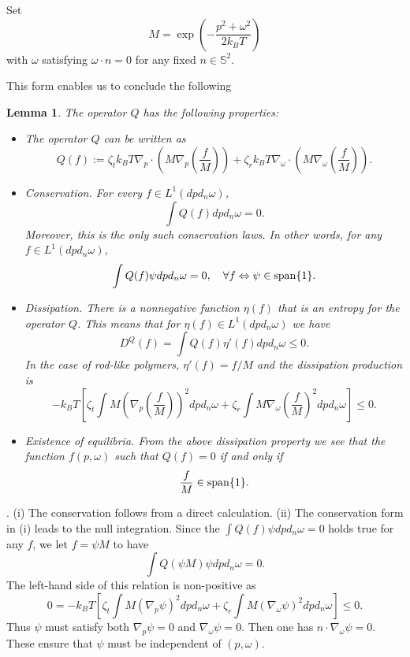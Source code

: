 \documentclass[reqno]{amsart}
\numberwithin{equation}{section}
\newtheorem{Lemma}{Lemma}[section]
\theoremstyle{definition}
\theoremstyle{remark}
\begin{document}
Set
$$
M=\exp\left(-\frac{p^2 +\omega^2}{2k_BT} \right)
$$
with $\omega$ satisfying $\omega \cdot n=0$ for any fixed $n \in \mathbb{S}^2$.

This form enables us to conclude the following
\begin{Lemma}\label{qq}
The operator $Q$ has the following properties:\\
\begin{itemize}
\item [(i)]The operator $Q$ can be written as
\begin{equation}\label{qf}
Q(f):=\zeta_t k_BT\nabla_p\cdot \left(M\nabla_p\left( \frac{f}{M}
\right)\right)+\zeta_rk_BT\nabla_\omega\cdot
\left(M\nabla_\omega\left( \frac{f}{M}\right)\right).
\end{equation}
\item[(ii)] Conservation. For every $f\in L^1(dpd_n\omega)$,
 $$\int Q(f)dp d_n \omega=0.$$
 Moreover, this is the only such conservation laws. In other words,
for any $f\in L^1(dpd_n\omega)$,
$$ \int Q(f)\psi dpd_n\omega=0, \quad \forall f \Leftrightarrow
\psi \in {\rm span} \{1\}.
$$
\item[(iii)] Dissipation. There is a nonnegative function $\eta(f)$
that is an entropy for the operator $Q$. This means that for
$\eta(f) \in L^1(dpd_n\omega)$ we have
$$
D^Q(f)=\int Q(f) \eta'(f) dpd_n\omega \leq 0.
$$
In the case of rod-like polymers,  $\eta'(f)=f/M$ and the
dissipation production is
$$
-k_BT \left[ \zeta_t \int M\left(\nabla_p\left(\frac{f}{M}\right)
\right)^2dp d_n\omega +\zeta_r \int M
\nabla_\omega\left(\frac{f}{M}\right)^2 dpd_n\omega \right]\leq 0.
$$

\item[(iv)] Existence of equilibria.  From the above dissipation
property we see that the function $f(p, \omega)$ such that $Q(f)=0$
if and only if
$$\frac{f}{M}\in  {\rm span}\{1\}.$$

\end{itemize}
\end{Lemma}
. (i) The conservation
follows from a direct calculation. (ii) The conservation form in (i)
leads to the null integration. Since the $ \int Q(f)\psi
dpd_n\omega=0$ holds true for any $f$, we let $f=\psi M$ to have
$$
\int Q(\psi M)\psi dpd_n\omega=0.
$$
The left-hand side of this relation is non-positive as
$$
0=-k_BT \left[ \zeta_t \int M\left(\nabla_p \psi \right)^2dp
d_n\omega +\zeta_r \int M (\nabla_\omega\psi)^2dpd_n \omega
\right]\leq 0.
$$
Thus $\psi$ must satisfy both $\nabla_p \psi=0$ and $\nabla_\omega
\psi =0$. Then one has $n \cdot \nabla_{\omega} \psi=0$. These
ensure that $\psi$ must be independent of $(p, \omega)$.
\end{document}
